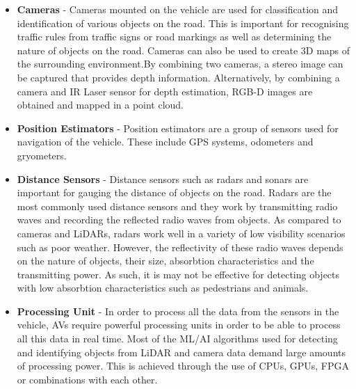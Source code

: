 \begin{itemize}
	
	\item \textbf{Cameras} - Cameras mounted on the vehicle are used for classification and identification of various objects on the road. This is important for recognising traffic rules from traffic signs or road markings as well as determining the nature of objects on the road. 
	Cameras can also be used to create 3D maps of the surrounding environment.By combining two cameras, a stereo image can be captured that provides depth information. Alternatively, by combining a camera and IR Laser sensor for depth estimation, RGB-D images are obtained and mapped in a point cloud.
	
	\item \textbf{Position Estimators} - Position estimators are a group of sensors used for navigation of the vehicle. These include GPS systems, odometers and gryometers. 
	\item \textbf{Distance Sensors} - Distance sensors such as radars and sonars are important for gauging the distance of objects on the road. 
	Radars are the most commonly used distance sensors and they work by transmitting radio waves and recording the reflected radio waves from objects. As compared to cameras and LiDARs, radars work well in a variety of low visibility scenarios such as poor weather. 
	However, the reflectivity of these radio waves depends on the nature of objects, their size, absorbtion characteristics and the transmitting power. As such, it is may not be effective for detecting objects with low absorbtion characteristics such as pedestrians and animals.
	
	\item \textbf{Processing Unit} - In order to process all the data from the sensors in the vehicle, AVs require powerful processing units in order to be able to process all this data in real time. Most of the ML/AI algorithms used for detecting and identifying objects from LiDAR and camera data demand large amounts of processing power. This is achieved through the use of CPUs, GPUs, FPGA or combinations with each other. 

\end{itemize}


